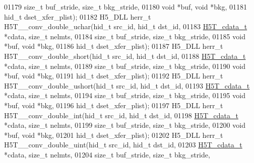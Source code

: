 \begin{DoxyCode}
01179                      \textcolor{keywordtype}{size\_t} buf\_stride, \textcolor{keywordtype}{size\_t} bkg\_stride,
01180                                      \textcolor{keywordtype}{void} *buf, \textcolor{keywordtype}{void} *bkg,
01181                                      hid\_t dset\_xfer\_plist);
01182 H5\_DLL herr\_t H5T\_\_conv\_double\_uchar(hid\_t src\_id, hid\_t dst\_id,
01183                      \hyperlink{struct_h5_t__cdata__t}{H5T\_cdata\_t} *cdata, \textcolor{keywordtype}{size\_t} nelmts,
01184                      \textcolor{keywordtype}{size\_t} buf\_stride, \textcolor{keywordtype}{size\_t} bkg\_stride,
01185                                      \textcolor{keywordtype}{void} *buf, \textcolor{keywordtype}{void} *bkg,
01186                                      hid\_t dset\_xfer\_plist);
01187 H5\_DLL herr\_t H5T\_\_conv\_double\_short(hid\_t src\_id, hid\_t dst\_id,
01188                      \hyperlink{struct_h5_t__cdata__t}{H5T\_cdata\_t} *cdata, \textcolor{keywordtype}{size\_t} nelmts,
01189                      \textcolor{keywordtype}{size\_t} buf\_stride, \textcolor{keywordtype}{size\_t} bkg\_stride,
01190                                      \textcolor{keywordtype}{void} *buf, \textcolor{keywordtype}{void} *bkg,
01191                                      hid\_t dset\_xfer\_plist);
01192 H5\_DLL herr\_t H5T\_\_conv\_double\_ushort(hid\_t src\_id, hid\_t dst\_id,
01193                      \hyperlink{struct_h5_t__cdata__t}{H5T\_cdata\_t} *cdata, \textcolor{keywordtype}{size\_t} nelmts,
01194                      \textcolor{keywordtype}{size\_t} buf\_stride, \textcolor{keywordtype}{size\_t} bkg\_stride,
01195                                      \textcolor{keywordtype}{void} *buf, \textcolor{keywordtype}{void} *bkg,
01196                                      hid\_t dset\_xfer\_plist);
01197 H5\_DLL herr\_t H5T\_\_conv\_double\_int(hid\_t src\_id, hid\_t dst\_id,
01198                      \hyperlink{struct_h5_t__cdata__t}{H5T\_cdata\_t} *cdata, \textcolor{keywordtype}{size\_t} nelmts,
01199                      \textcolor{keywordtype}{size\_t} buf\_stride, \textcolor{keywordtype}{size\_t} bkg\_stride,
01200                                      \textcolor{keywordtype}{void} *buf, \textcolor{keywordtype}{void} *bkg,
01201                                      hid\_t dset\_xfer\_plist);
01202 H5\_DLL herr\_t H5T\_\_conv\_double\_uint(hid\_t src\_id, hid\_t dst\_id,
01203                      \hyperlink{struct_h5_t__cdata__t}{H5T\_cdata\_t} *cdata, \textcolor{keywordtype}{size\_t} nelmts,
01204                      \textcolor{keywordtype}{size\_t} buf\_stride, \textcolor{keywordtype}{size\_t} bkg\_stride,

\end{DoxyCode}
